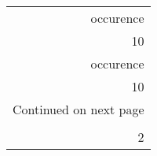 \begin{longtable}{r}
\toprule
 occurence \\
        10 \\
\midrule
\endfirsthead

\toprule
 occurence \\
        10 \\
\midrule
\endhead
\midrule
\multicolumn{1}{r}{{Continued on next page}} \\
\midrule
\endfoot

\bottomrule
\endlastfoot
         5 \\
         2 \\
\end{longtable}
